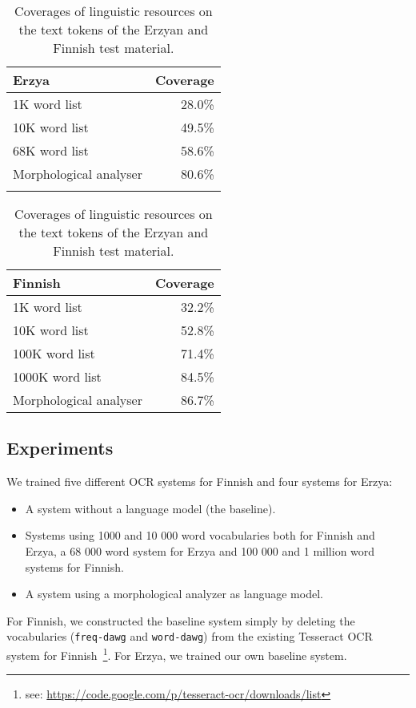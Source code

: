 \documentclass[b5paper]{article}
\begin{document}
\begin{table}[!htb]
\begin{center}
\begin{tabular}{lr}
\hline 
Erzya                   & Coverage  \\
\hline 
1K word list            &   28.0\%  \\
10K word list           &   49.5\%  \\
68K word list           &   58.6\%  \\
Morphological analyser  &   80.6\%  \\
                        &
\end{tabular}
\quad
\begin{tabular}{lr}
\hline 
Finnish                 & Coverage \\
\hline 
1K word list            &  32.2\% \\
10K word list           &  52.8\% \\
100K word list          &  71.4\% \\
1000K word list         &  84.5\% \\
Morphological analyser  &  86.7\% 
\end{tabular}
\caption{Coverages of linguistic resources on the text tokens of the Erzyan and Finnish test
  material.}\label{fin-myv-coverage}
\end{center}
\end{table}

\subsection{Experiments}
We trained five different OCR systems for Finnish and four systems for Erzya:
\begin{itemize}
\item A system without a language model (the baseline).
\item Systems using 1000 and 10 000 word vocabularies both for Finnish
  and Erzya, a 68 000 word system for Erzya and 100 000 and 1 million
  word systems for Finnish.
\item A system using a morphological analyzer as language model.
\end{itemize}

For Finnish, we constructed the baseline system simply by deleting the
vocabularies ({\tt freq-dawg} and {\tt word-dawg}) from the existing
Tesseract OCR system for Finnish~\footnote{see:
  \url{https://code.google.com/p/tesseract-ocr/downloads/list}}. For
Erzya, we trained our own baseline system.
\end{document}
